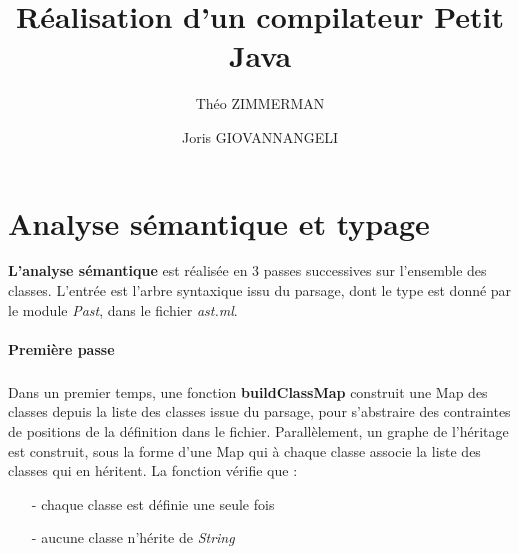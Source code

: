 \documentclass{article}
\title{Réalisation d'un compilateur Petit Java}
\author{Théo ZIMMERMAN \and Joris GIOVANNANGELI}
\begin{document}
\maketitle
\section{Analyse sémantique et typage}

\textbf{L'analyse sémantique} est réalisée en 3 passes successives sur l'ensemble des classes. L'entrée est l'arbre syntaxique issu du parsage, dont le type est donné par le module \emph{Past}, dans le fichier \emph{ast.ml}.

\paragraph{Première passe}
\subparagraph*{}
 Dans un premier temps, une fonction \textbf{buildClassMap} construit une Map des classes depuis la liste des classes issue du parsage, pour s'abstraire des contraintes de positions de la définition dans le fichier. Parallèlement, un graphe de l'héritage est construit, sous la forme d'une Map qui à chaque classe associe la liste des classes qui en héritent. La fonction vérifie que :
 \begin{itemize} 
   \item[-] chaque classe est définie une seule fois
   \item[-] aucune classe n'hérite de \emph{String}
\end{itemize}
\end{document}
